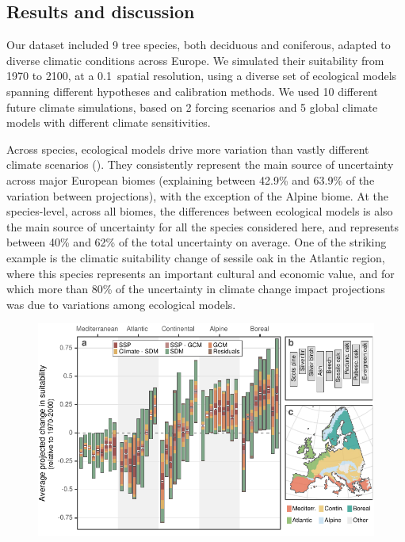\documentclass[11pt,letter]{article}
\begin{document}
\subsection*{Results and discussion}

Our dataset included 9 tree species, both deciduous and coniferous, adapted to diverse climatic conditions across Europe. We simulated their suitability from 1970 to 2100, at a 0.1\degree~spatial resolution, using a diverse set of ecological models spanning different hypotheses and calibration methods. We used 10 different future climate simulations, based on 2 forcing scenarios and 5 global climate models with different climate sensitivities.

Across species, ecological models drive more variation than vastly different climate scenarios (). They consistently represent the main source of uncertainty across major European biomes (explaining between 42.9\% and 63.9\% of the variation between projections), with the exception of the Alpine biome. At the species-level, across all biomes, the differences between ecological models is also the main source of uncertainty for all the species considered here, and represents between 40\% and 62\% of the total uncertainty on average. One of the striking example is the climatic suitability change of sessile oak in the Atlantic region, where this species represents an important cultural and economic value, and for which more than 80\% of the uncertainty in climate change impact projections was due to variations among ecological models. 


\begin{figure}
	\centering
	\includegraphics[width=0.85\linewidth]{../newfigures/files/figure1}
	\caption{}
	\label{fig:anovaspecies}
\end{figure}
\end{document}
